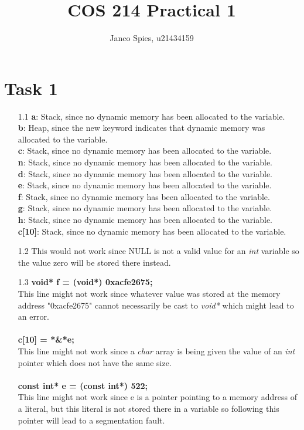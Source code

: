 \documentclass{article}
\begin{document}
\title{COS 214 Practical 1}
\author{Janco Spies, u21434159}
\maketitle
\section*{Task 1}
\begin{itemize}
    \item[1.1]\textbf{a}: Stack, since no dynamic memory has been allocated to the variable.\\
               \textbf{b}: Heap, since the new keyword indicates that dynamic memory was allocated to the variable.\\
               \textbf{c}: Stack, since no dynamic memory has been allocated to the variable.\\
               \textbf{n}: Stack, since no dynamic memory has been allocated to the variable.\\
               \textbf{d}: Stack, since no dynamic memory has been allocated to the variable.\\
               \textbf{e}: Stack, since no dynamic memory has been allocated to the variable.\\
               \textbf{f}: Stack, since no dynamic memory has been allocated to the variable.\\
               \textbf{g}: Stack, since no dynamic memory has been allocated to the variable.\\
               \textbf{h}: Stack, since no dynamic memory has been allocated to the variable.\\
               \textbf{c[10]}: Stack, since no dynamic memory has been allocated to the variable.
    \item[1.2] This would not work since NULL is not a valid value for an \textit{int} variable so the value zero will be stored there instead.
    \item[1.3] \textbf{void* f = (void*) 0xacfe2675;}\\ This line might not work since whatever value was stored at the memory address "0xacfe2675" cannot necessarily be cast to \textit{void*} which might lead to an error.\\~\\
                \textbf{c[10] = *\&*e;}\\ This line might not work since a \textit{char} array is being given the value of an \textit{int} pointer which does not have the same size.\\~\\
                \textbf{const int* e = (const int*) 522;}\\ This line might not work since e is a pointer pointing to a memory address of a literal, but this literal is not stored there in a variable so following this pointer will lead to a segmentation fault.
\end{itemize}
\end{document}
